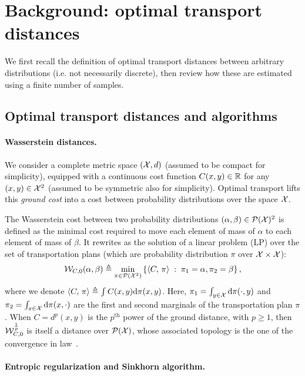 \section{Background: optimal transport distances}

We first recall the definition of optimal transport distances between arbitrary distributions (i.e. not necessarily discrete), then review how these are estimated using a finite number of samples.

\subsection{Optimal transport distances and algorithms}

\paragraph{Wasserstein distances.} 

We consider a complete metric space $(\mathcal{X},d)$ (assumed to be compact for simplicity), equipped
with a continuous cost function $C(x,y) \in \mathbb{R}$ for any $(x,y) \in \mathcal{X}^2$ (assumed to be symmetric also for simplicity). 
%
Optimal transport lifts this \textit{ground cost} into a cost between probability
distributions over the space $\mathcal{X}$. 
%

The Wasserstein cost between two probability distributions $(\alpha, \beta) \in \mathcal{P}(\mathcal{X})^2$ is defined as the minimal cost required to move each element of mass of $\alpha$ to each element of mass of $\beta$. It rewrites as the solution of a
linear problem (LP) over the set of transportation plans (which are probability distribution $\pi$ over $\mathcal{X} \times \mathcal{X}$):
\begin{equation}\label{eq:wass_0}
    \mathcal{W}_{C,0}(\alpha, \beta) \triangleq 
    \min_{\pi \in \mathcal{P}(\mathcal{X}^2)}
    \left\{ 
    	\langle C,\,\pi\rangle
	 \;:\;  \pi_1=\alpha, \pi_2=\beta \right\},
\end{equation}
where we denote $\langle C,\,\pi\rangle \triangleq \int C(x,y) \textrm{d}\pi(x,y)$. Here,  
$\pi_1 = \int_{y\in \mathcal{X}} \textrm{d} \pi(\cdot, y)$ and $\pi_2 = \int_{x\in \mathcal{X}} \textrm{d}
\pi(x, \cdot)$ are the first and second marginals of the transportation plan $\pi$. 
%
When $C=d^p(x,y)$ is the $p^{\text{th}}$ power of the ground distance, with $p
\geq 1$, then $\mathcal{W}_{C,0}^{\frac{1}{p}}$ is itself a distance over $\mathcal{P}(\mathcal{X})$, whose
associated topology is the one of the convergence in
law~\citep{santambrogio2015optimal}.

\paragraph{Entropic regularization and Sinkhorn algorithm.} 

